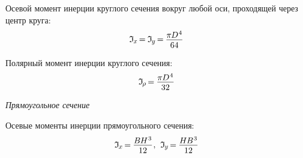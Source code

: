 \documentclass[14pt]{extarticle}
\begin{document}
Осевой момент инерции круглого сечения вокруг любой оси, проходящей через центр круга:
\[
\mathfrak{I}_{\hspace{-0.1ex}\scalebox{.8}{$x$}} \hspace{-0.25ex}=\hspace{-0.1ex}
\mathfrak{I}_{\hspace{-0.1ex}\scalebox{.8}{$y$}} \hspace{-0.25ex}=\hspace{-0.1ex}
\displaystyle\frac{\raisebox{-0.18em}{$\pi \hspace{-0.1ex} D^{\hspace{.1ex}4}$}}{64}
\]

Полярный момент инерции круглого сечения:
\[
\mathfrak{I}_{\hspace{-0.2ex}\scalebox{.8}{$\rho$}} \hspace{-0.25ex}=\hspace{-0.1ex}
\displaystyle\frac{\raisebox{-0.18em}{$\pi \hspace{-0.1ex} D^{\hspace{.1ex}4}$}}{32}
\]

\vspace{.8cm}

\begin{center}

\emph{Прямоугольное сечение}
\vspace{.7cm}


\end{center}

Осевые моменты инерции прямоугольного сечения:
\[
\mathfrak{I}_{\hspace{-0.1ex}\scalebox{.8}{$x$}} \hspace{-0.25ex}=\hspace{-0.1ex}
\displaystyle\frac{\raisebox{-0.18em}{$B \hspace{-0.1ex} H^{\hspace{.1ex}3}$}}{12}
\hspace{.1ex} , \hspace{.4em}
 \mathfrak{I}_{\hspace{-0.1ex}\scalebox{.8}{$y$}} \hspace{-0.25ex}=\hspace{-0.1ex}
\displaystyle\frac{\raisebox{-0.18em}{$H \hspace{-0.1ex} B^{\hspace{.1ex}3}$}}{12}
\]
\end{document}
